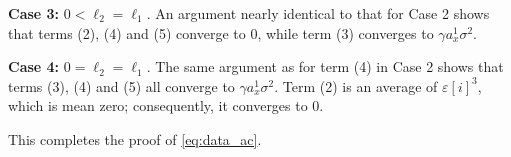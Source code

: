 \documentclass[english,11pt]{article}
\newcommand{\ep}{\varepsilon}
\newcommand{\1}{\mathbf{1}}
\numberwithin{equation}{section}
\theoremstyle{plain}
\theoremstyle{definition}
\theoremstyle{remark}
\theoremstyle{plain}
\theoremstyle{remark}
\theoremstyle{plain}
\theoremstyle{plain}
\newcommand{\SNR}{\ensuremath{\textsf{SNR}}}
\begin{document}
{\bf Case 3:} $0<\ell_2 = \ell_1$. An argument nearly identical to that for Case 2 shows that terms (2), (4) and (5) converge to 0, while term (3) converges to $\gamma a_x^1 \sigma^2$.

{\bf Case 4:} $0=\ell_2 = \ell_1$. The same argument as for term (4) in Case 2 shows that terms (3), (4) and (5) all converge to $\gamma a_x^1 \sigma^2$. Term (2) is an average of $\ep[i]^3$, which is mean zero; consequently, it converges to 0.


This completes the proof of \eqref{eq:data_ac}.

\end{document}
